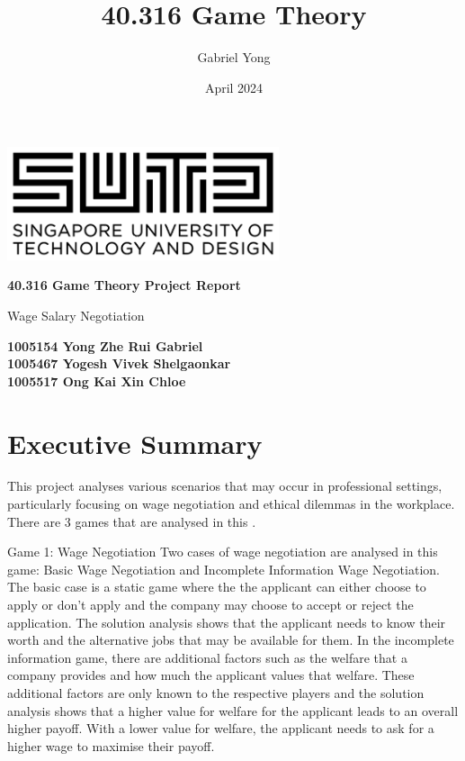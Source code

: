 \documentclass[a4paper, 12pt]{article}
\title{40.316 Game Theory}
\author{Gabriel Yong}
\date{April 2024}
\begin{document}

\begin{titlepage}
   \begin{center}
       \vspace*{1cm}
          \includegraphics[width=0.6\textwidth]{img/Header.png}  
       \vspace{2cm}
     
       
        \Huge
       \textbf{40.316 Game Theory Project Report}
       
       

       \vspace{0.5cm}
       \Large
       Wage Salary Negotiation
            
       \vspace{1.5cm}
       \textbf{1005154 Yong Zhe Rui Gabriel}\\
       \textbf{1005467 Yogesh Vivek Shelgaonkar }\\
       \textbf{1005517 Ong Kai Xin Chloe }\\

       
       
        
       \vfill
            
   \end{center}
\end{titlepage}

\section*{Executive Summary}
This project analyses various scenarios that may occur in professional settings, particularly focusing on wage negotiation and ethical dilemmas in the workplace. There are 3 games that are analysed in this .

Game 1: Wage Negotiation
\newline
Two cases of wage negotiation are analysed in this game: Basic Wage Negotiation and Incomplete Information Wage Negotiation. The basic case is a static game where the the applicant can either choose to apply or don't apply and the company may choose to accept or reject the application. The solution analysis shows that the applicant needs to know their worth and the alternative jobs that may be available for them. In the incomplete information game, there are additional factors such as the welfare that a company provides and how much the applicant values that welfare. These additional factors are only known to the respective players and the solution analysis shows that a higher value for welfare for the applicant leads to an overall higher payoff. With a lower value for welfare, the applicant needs to ask for a higher wage to maximise their payoff.
\end{document}

